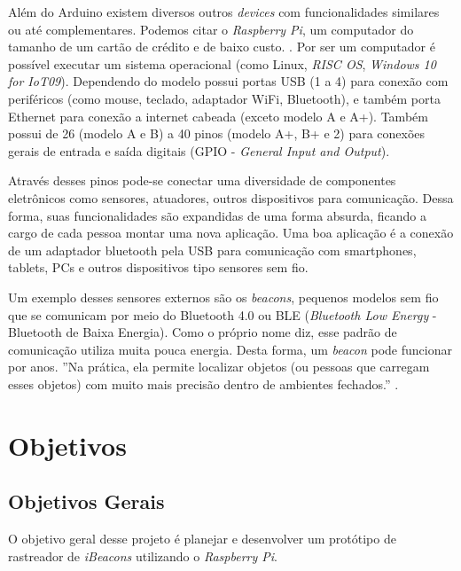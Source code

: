 \documentclass[
	12pt,				%
	openright,			%
	oneside,			%
	a4paper,			%
	chapter=TITLE,		%
	english,			%
	brazil				%
	]{abntex2}
\begin{document}
{Além do Arduino existem diversos outros \textit{devices} com funcionalidades similares ou até complementares. Podemos citar o \textit{Raspberry Pi}, um computador do tamanho de um cartão de crédito e de baixo custo. \cite{raspberrypi-rpi}. Por ser um computador é possível executar um sistema operacional (como Linux, \textit{RISC OS}, \textit{Windows 10 for IoT09}). Dependendo do modelo possui portas USB (1 a 4) para conexão com periféricos (como mouse, teclado, adaptador WiFi, Bluetooth), e também porta Ethernet para conexão a internet cabeada (exceto modelo A e A+). Também possui de 26 (modelo A e B) a 40 pinos (modelo A+, B+ e 2) para conexões gerais de entrada e saída digitais (GPIO - \textit{General Input and Output}). 

Através desses pinos pode-se conectar uma diversidade de componentes eletrônicos como sensores, atuadores, outros dispositivos para comunicação. Dessa forma, suas funcionalidades são expandidas de uma forma absurda, ficando a cargo de cada pessoa montar uma nova aplicação. Uma boa aplicação é a conexão de um adaptador bluetooth pela USB para comunicação com smartphones, tablets, PCs e outros dispositivos tipo sensores sem fio.

Um exemplo desses sensores externos são os \textit{beacons}, pequenos modelos sem fio que se comunicam por meio do Bluetooth 4.0 ou BLE (\textit{Bluetooth Low Energy} - Bluetooth de Baixa Energia). Como o próprio nome diz, esse padrão de comunicação utiliza muita pouca energia. Desta forma, um \textit{beacon} pode funcionar por anos. ''Na prática, ela permite localizar objetos (ou pessoas que carregam esses objetos) com muito mais precisão dentro de ambientes fechados.'' \cite{teixeira-beacon}.



\chapter{Objetivos}

\section{Objetivos Gerais}

O objetivo geral desse projeto é planejar e desenvolver um protótipo de rastreador de \textit{iBeacons} utilizando o \textit{Raspberry Pi}.

}
\end{document}
